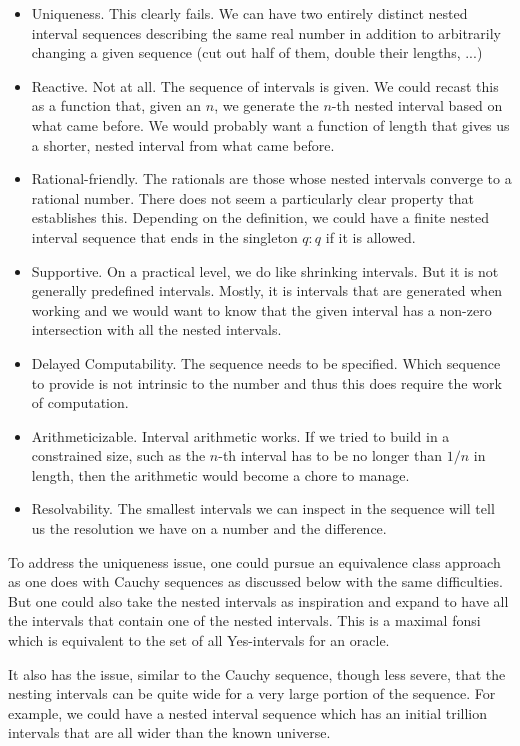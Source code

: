 \documentclass[12pt]{article}
\theoremstyle{remark}
\begin{document}
\begin{itemize}
    \item Uniqueness. This clearly fails. We can have two entirely distinct nested interval sequences describing the same real number in addition to arbitrarily changing a given sequence (cut out half of them, double their lengths, ...)
    \item Reactive. Not at all. The sequence of intervals is given. We could recast this as a function that, given an $n$, we generate the $n$-th nested interval based on what came before. We would probably want a function of length that gives us a shorter, nested interval from what came before. 
    \item Rational-friendly. The rationals are those whose nested intervals converge to a rational number. There does not seem a particularly clear property that establishes this. Depending on the definition, we could have a finite nested interval sequence that ends in the singleton $q:q$ if it is allowed. 
    \item Supportive. On a practical level, we do like shrinking intervals. But it is not generally predefined intervals. Mostly, it is intervals that are generated when working and we would want to know that the given interval has a non-zero intersection with all the nested intervals. 
    \item Delayed Computability. The sequence needs to be specified. Which sequence to provide is not intrinsic to the number and thus this does require the work of computation.  
    \item Arithmeticizable. Interval arithmetic works. If we tried to build in a constrained size, such as the $n$-th interval has to be no longer than $1/n$ in length, then the arithmetic would become a chore to manage. 
    \item Resolvability. The smallest intervals we can inspect in the sequence will tell us the resolution we have on a number and the difference. 
\end{itemize}

To address the uniqueness issue, one could pursue an equivalence class approach as one does with Cauchy sequences as discussed below with the same difficulties. But one could also take the nested intervals as inspiration and expand to have all the intervals that contain one of the nested intervals. This is a maximal fonsi which is equivalent to the set of all Yes-intervals for an oracle. 

It also has the issue, similar to the Cauchy sequence, though less severe, that the nesting intervals can be quite wide for a very large portion of the sequence.  For example, we could have a nested interval sequence which has an initial trillion intervals that are all wider than the known universe. 
\end{document}
